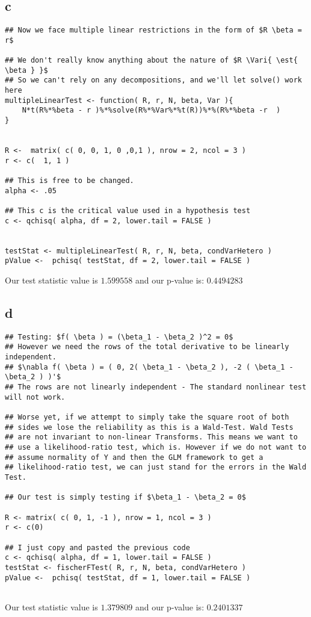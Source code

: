 \documentclass[12pt]{paper}
\begin{document}
\subsection*{c}

\begin{verbatim}
## Now we face multiple linear restrictions in the form of $R \beta = r$

## We don't really know anything about the nature of $R \Vari{ \est{ \beta } }$
## So we can't rely on any decompositions, and we'll let solve() work here
multipleLinearTest <- function( R, r, N, beta, Var ){
    N*t(R%*%beta - r )%*%solve(R%*%Var%*%t(R))%*%(R%*%beta -r  )
}


R <-  matrix( c( 0, 0, 1, 0 ,0,1 ), nrow = 2, ncol = 3 )
r <- c(  1, 1 )

## This is free to be changed.
alpha <- .05

## This c is the critical value used in a hypothesis test
c <- qchisq( alpha, df = 2, lower.tail = FALSE )


testStat <- multipleLinearTest( R, r, N, beta, condVarHetero )
pValue <-  pchisq( testStat, df = 2, lower.tail = FALSE )

\end{verbatim}

Our test statistic value is $1.599558$ and our p-value is: $0.4494283$

\subsection*{d}


\begin{verbatim}
## Testing: $f( \beta ) = (\beta_1 - \beta_2 )^2 = 0$
## However we need the rows of the total derivative to be linearly independent.
## $\nabla f( \beta ) = ( 0, 2( \beta_1 - \beta_2 ), -2 ( \beta_1 - \beta_2 ) )'$
## The rows are not linearly independent - The standard nonlinear test will not work.

## Worse yet, if we attempt to simply take the square root of both
## sides we lose the reliability as this is a Wald-Test. Wald Tests
## are not invariant to non-linear Transforms. This means we want to
## use a likelihood-ratio test, which is. However if we do not want to
## assume normality of Y and then the GLM framework to get a
## likelihood-ratio test, we can just stand for the errors in the Wald Test.

## Our test is simply testing if $\beta_1 - \beta_2 = 0$

R <- matrix( c( 0, 1, -1 ), nrow = 1, ncol = 3 )
r <- c(0)

## I just copy and pasted the previous code
c <- qchisq( alpha, df = 1, lower.tail = FALSE )
testStat <- fischerFTest( R, r, N, beta, condVarHetero )
pValue <-  pchisq( testStat, df = 1, lower.tail = FALSE )
   
\end{verbatim}
Our test statistic value is $1.379809$ and our p-value is: $0.2401337$
\end{document}
